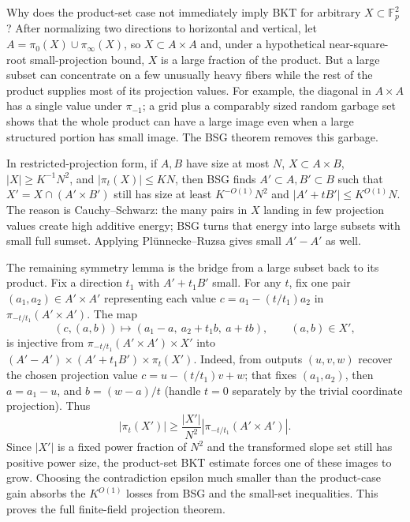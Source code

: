 Why does the product-set case not immediately imply BKT for arbitrary \(X\subset\mathbb F_p^2\)? After normalizing two directions to horizontal and vertical, let \(A=\pi_0(X)\cup\pi_\infty(X)\), so \(X\subset A\times A\) and, under a hypothetical near-square-root small-projection bound, \(X\) is a large fraction of the product. But a large subset can concentrate on a few unusually heavy fibers while the rest of the product supplies most of its projection values. For example, the diagonal in \(A\times A\) has a single value under \(\pi_{-1}\); a grid plus a comparably sized random garbage set shows that the whole product can have a large image even when a large structured portion has small image. The BSG theorem removes this garbage.

In restricted-projection form, if \(A,B\) have size at most \(N\), \(X\subset A\times B\), \(|X|\ge K^{-1}N^2\), and \(|\pi_t(X)|\le KN\), then BSG finds \(A'\subset A,B'\subset B\) such that \(X'=X\cap(A'\times B')\) still has size at least \(K^{-O(1)}N^2\) and \(|A'+tB'|\le K^{O(1)}N\). The reason is Cauchy--Schwarz: the many pairs in \(X\) landing in few projection values create high additive energy; BSG turns that energy into large subsets with small full sumset. Applying Plünnecke--Ruzsa gives small \(A'-A'\) as well.

The remaining symmetry lemma is the bridge from a large subset back to its product. Fix a direction \(t_1\) with \(A'+t_1B'\) small. For any \(t\), fix one pair \((a_1,a_2)\in A'\times A'\) representing each value \(c=a_1-(t/t_1)a_2\) in \(\pi_{-t/t_1}(A'\times A')\). The map \[
(c,(a,b))\mapsto(a_1-a,\ a_2+t_1b,\ a+tb),\qquad (a,b)\in X',
\] is injective from \(\pi_{-t/t_1}(A'\times A')\times X'\) into \((A'-A')\times(A'+t_1B')\times\pi_t(X')\). Indeed, from outputs \((u,v,w)\) recover the chosen projection value \(c=u-(t/t_1)v+w\); that fixes \((a_1,a_2)\), then \(a=a_1-u\), and \(b=(w-a)/t\) (handle \(t=0\) separately by the trivial coordinate projection). Thus \[
|\pi_t(X')|\ge \frac{|X'|}{N^2}|\pi_{-t/t_1}(A'\times A')|.
\] Since \(|X'|\) is a fixed power fraction of \(N^2\) and the transformed slope set still has positive power size, the product-set BKT estimate forces one of these images to grow. Choosing the contradiction epsilon much smaller than the product-case gain absorbs the \(K^{O(1)}\) losses from BSG and the small-set inequalities. This proves the full finite-field projection theorem.

